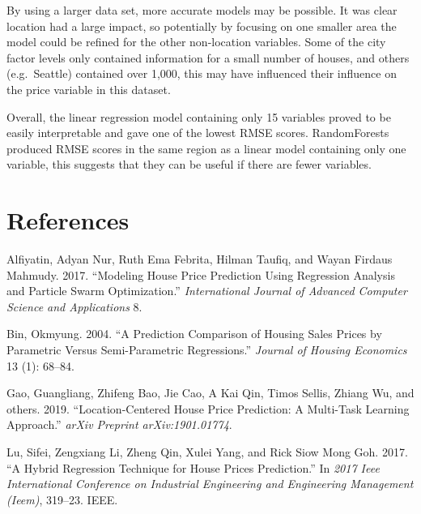 \documentclass[
]{article}
\begin{document}
By using a larger data set, more accurate models may be possible. It was
clear location had a large impact, so potentially by focusing on one
smaller area the model could be refined for the other non-location
variables. Some of the city factor levels only contained information for
a small number of houses, and others (e.g.~Seattle) contained over
1,000, this may have influenced their influence on the price variable in
this dataset.

Overall, the linear regression model containing only 15 variables proved
to be easily interpretable and gave one of the lowest RMSE scores.
RandomForests produced RMSE scores in the same region as a linear model
containing only one variable, this suggests that they can be useful if
there are fewer variables.

\hypertarget{references}{%
\section*{References}\label{references}}

\hypertarget{refs}{}
\leavevmode\hypertarget{ref-alfiyatin2017modeling}{}%
Alfiyatin, Adyan Nur, Ruth Ema Febrita, Hilman Taufiq, and Wayan Firdaus
Mahmudy. 2017. ``Modeling House Price Prediction Using Regression
Analysis and Particle Swarm Optimization.'' \emph{International Journal
of Advanced Computer Science and Applications} 8.

\leavevmode\hypertarget{ref-bin2004prediction}{}%
Bin, Okmyung. 2004. ``A Prediction Comparison of Housing Sales Prices by
Parametric Versus Semi-Parametric Regressions.'' \emph{Journal of
Housing Economics} 13 (1): 68--84.

\leavevmode\hypertarget{ref-gao2019location}{}%
Gao, Guangliang, Zhifeng Bao, Jie Cao, A Kai Qin, Timos Sellis, Zhiang
Wu, and others. 2019. ``Location-Centered House Price Prediction: A
Multi-Task Learning Approach.'' \emph{arXiv Preprint arXiv:1901.01774}.

\leavevmode\hypertarget{ref-lu2017hybrid}{}%
Lu, Sifei, Zengxiang Li, Zheng Qin, Xulei Yang, and Rick Siow Mong Goh.
2017. ``A Hybrid Regression Technique for House Prices Prediction.'' In
\emph{2017 Ieee International Conference on Industrial Engineering and
Engineering Management (Ieem)}, 319--23. IEEE.
\end{document}
